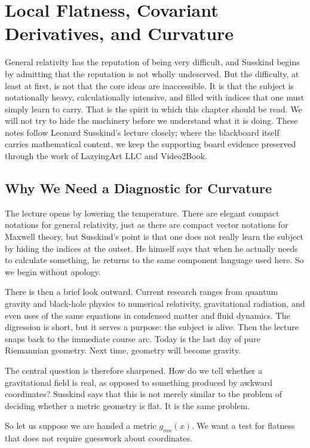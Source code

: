 \chapter{Local Flatness, Covariant Derivatives, and Curvature}

General relativity has the reputation of being very difficult, and Susskind begins by admitting that the reputation is not wholly undeserved. But the difficulty, at least at first, is not that the core ideas are inaccessible. It is that the subject is notationally heavy, calculationally intensive, and filled with indices that one must simply learn to carry. That is the spirit in which this chapter should be read. We will not try to hide the machinery before we understand what it is doing. These notes follow Leonard Susskind's lecture closely; where the blackboard itself carries mathematical content, we keep the supporting board evidence preserved through the work of LazyingArt LLC and Video2Book.

\section{Why We Need a Diagnostic for Curvature}

The lecture opens by lowering the temperature. There are elegant compact notations for general relativity, just as there are compact vector notations for Maxwell theory, but Susskind's point is that one does not really learn the subject by hiding the indices at the outset. He himself says that when he actually needs to calculate something, he returns to the same component language used here. So we begin without apology.

There is then a brief look outward. Current research ranges from quantum gravity and black-hole physics to numerical relativity, gravitational radiation, and even uses of the same equations in condensed matter and fluid dynamics. The digression is short, but it serves a purpose: the subject is alive. Then the lecture snaps back to the immediate course arc. Today is the last day of pure Riemannian geometry. Next time, geometry will become gravity.

The central question is therefore sharpened. How do we tell whether a gravitational field is real, as opposed to something produced by awkward coordinates? Susskind says that this is not merely similar to the problem of deciding whether a metric geometry is flat. It is the same problem.

So let us suppose we are handed a metric \(g_{mn}(x)\). We want a test for flatness that does not require guesswork about coordinates.

